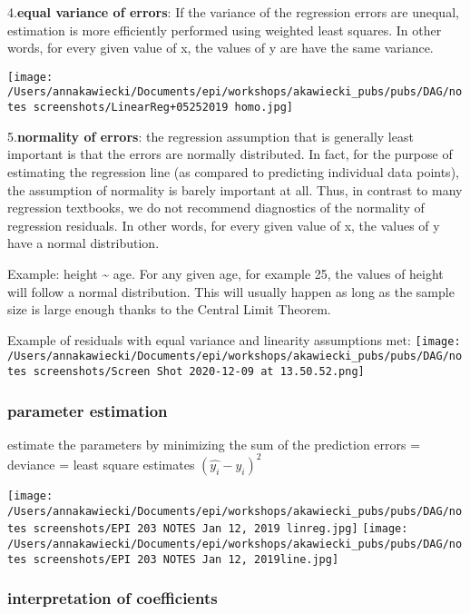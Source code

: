 \documentclass[
]{article}
\begin{document}
4.\textbf{equal variance of errors}: If the variance of the regression
errors are unequal, estimation is more efficiently performed using
weighted least squares. In other words, for every given value of x, the
values of y are have the same variance.

\texttt{[image: /Users/annakawiecki/Documents/epi/workshops/akawiecki\_pubs/pubs/DAG/notes screenshots/LinearReg+05252019 homo.jpg]}

5.\textbf{normality of errors}: the regression assumption that is
generally least important is that the errors are normally distributed.
In fact, for the purpose of estimating the regression line (as compared
to predicting individual data points), the assumption of normality is
barely important at all. Thus, in contrast to many regression textbooks,
we do not recommend diagnostics of the normality of regression
residuals. In other words, for every given value of x, the values of y
have a normal distribution.

Example: height \textasciitilde{} age. For any given age, for example
25, the values of height will follow a normal distribution. This will
usually happen as long as the sample size is large enough thanks to the
Central Limit Theorem.

Example of residuals with equal variance and linearity assumptions met:
\texttt{[image: /Users/annakawiecki/Documents/epi/workshops/akawiecki\_pubs/pubs/DAG/notes screenshots/Screen Shot 2020-12-09 at 13.50.52.png]}

\hypertarget{parameter-estimation}{%
\subsubsection{parameter estimation}\label{parameter-estimation}}

estimate the parameters \beta by minimizing the sum of the prediction
errors = deviance = least square estimates
\((\hat{y_i}- \hat{y_i})^{2}\)

\texttt{[image: /Users/annakawiecki/Documents/epi/workshops/akawiecki\_pubs/pubs/DAG/notes screenshots/EPI 203 NOTES Jan 12, 2019 linreg.jpg]}
\texttt{[image: /Users/annakawiecki/Documents/epi/workshops/akawiecki\_pubs/pubs/DAG/notes screenshots/EPI 203 NOTES Jan 12, 2019line.jpg]}

\hypertarget{interpretation-of-coefficients}{%
\subsubsection{interpretation of
coefficients}\label{interpretation-of-coefficients}}
\end{document}
